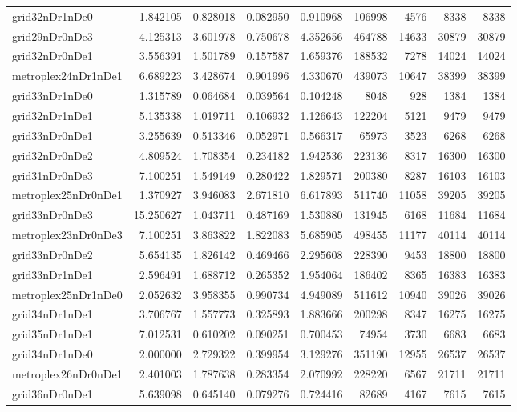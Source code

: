 \begin{longtable}{|l|r|r|r|r|r|r|r|r|}
grid32nDr1nDe0 & 1.842105 & 0.828018 & 0.082950 & 0.910968 & 106998 & 4576 & 8338 & 8338 \\
grid29nDr0nDe3 & 4.125313 & 3.601978 & 0.750678 & 4.352656 & 464788 & 14633 & 30879 & 30879 \\
grid32nDr0nDe1 & 3.556391 & 1.501789 & 0.157587 & 1.659376 & 188532 & 7278 & 14024 & 14024 \\
metroplex24nDr1nDe1 & 6.689223 & 3.428674 & 0.901996 & 4.330670 & 439073 & 10647 & 38399 & 38399 \\
grid33nDr1nDe0 & 1.315789 & 0.064684 & 0.039564 & 0.104248 & 8048 & 928 & 1384 & 1384 \\
grid32nDr1nDe1 & 5.135338 & 1.019711 & 0.106932 & 1.126643 & 122204 & 5121 & 9479 & 9479 \\
grid33nDr0nDe1 & 3.255639 & 0.513346 & 0.052971 & 0.566317 & 65973 & 3523 & 6268 & 6268 \\
grid32nDr0nDe2 & 4.809524 & 1.708354 & 0.234182 & 1.942536 & 223136 & 8317 & 16300 & 16300 \\
grid31nDr0nDe3 & 7.100251 & 1.549149 & 0.280422 & 1.829571 & 200380 & 8287 & 16103 & 16103 \\
metroplex25nDr0nDe1 & 1.370927 & 3.946083 & 2.671810 & 6.617893 & 511740 & 11058 & 39205 & 39205 \\
grid33nDr0nDe3 & 15.250627 & 1.043711 & 0.487169 & 1.530880 & 131945 & 6168 & 11684 & 11684 \\
metroplex23nDr0nDe3 & 7.100251 & 3.863822 & 1.822083 & 5.685905 & 498455 & 11177 & 40114 & 40114 \\
grid33nDr0nDe2 & 5.654135 & 1.826142 & 0.469466 & 2.295608 & 228390 & 9453 & 18800 & 18800 \\
grid33nDr1nDe1 & 2.596491 & 1.688712 & 0.265352 & 1.954064 & 186402 & 8365 & 16383 & 16383 \\
metroplex25nDr1nDe0 & 2.052632 & 3.958355 & 0.990734 & 4.949089 & 511612 & 10940 & 39026 & 39026 \\
grid34nDr1nDe1 & 3.706767 & 1.557773 & 0.325893 & 1.883666 & 200298 & 8347 & 16275 & 16275 \\
grid35nDr1nDe1 & 7.012531 & 0.610202 & 0.090251 & 0.700453 & 74954 & 3730 & 6683 & 6683 \\
grid34nDr1nDe0 & 2.000000 & 2.729322 & 0.399954 & 3.129276 & 351190 & 12955 & 26537 & 26537 \\
metroplex26nDr0nDe1 & 2.401003 & 1.787638 & 0.283354 & 2.070992 & 228220 & 6567 & 21711 & 21711 \\
grid36nDr0nDe1 & 5.639098 & 0.645140 & 0.079276 & 0.724416 & 82689 & 4167 & 7615 & 7615 \\

\end{longtable}
